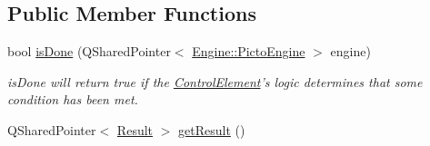 \subsection*{Public Member Functions}
\begin{DoxyCompactItemize}
\item 
\hypertarget{class_picto_1_1_target_controller_af4af003d976912a0869f95a603c803e8}{bool \hyperlink{class_picto_1_1_target_controller_af4af003d976912a0869f95a603c803e8}{is\-Done} (Q\-Shared\-Pointer$<$ \hyperlink{class_picto_1_1_engine_1_1_picto_engine}{Engine\-::\-Picto\-Engine} $>$ engine)}\label{class_picto_1_1_target_controller_af4af003d976912a0869f95a603c803e8}

\begin{DoxyCompactList}\small\item\em is\-Done will return true if the \hyperlink{class_picto_1_1_control_element}{Control\-Element}'s logic determines that some condition has been met. \end{DoxyCompactList}\item 
\hypertarget{class_picto_1_1_target_controller_a7263dc3b6a1de5dbbfcd8c928e5f2a19}{Q\-Shared\-Pointer$<$ \hyperlink{class_picto_1_1_result}{Result} $>$ \hyperlink{class_picto_1_1_target_controller_a7263dc3b6a1de5dbbfcd8c928e5f2a19}{get\-Result} ()}\label{class_picto_1_1_target_controller_a7263dc3b6a1de5dbbfcd8c928e5f2a19}


\end{DoxyCompactItemize}
